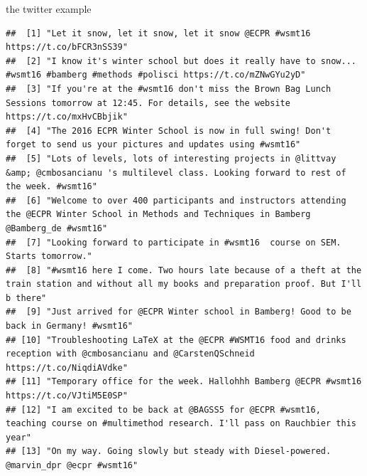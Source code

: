 \documentclass[ignorenonframetext,]{beamer}
\newenvironment{Shaded}{\begin{snugshade}}{\end{snugshade}}
\newcommand{\KeywordTok}[1]{\textcolor[rgb]{0.13,0.29,0.53}{\textbf{{#1}}}}
\newcommand{\DataTypeTok}[1]{\textcolor[rgb]{0.13,0.29,0.53}{{#1}}}
\newcommand{\StringTok}[1]{\textcolor[rgb]{0.31,0.60,0.02}{{#1}}}
\newcommand{\OtherTok}[1]{\textcolor[rgb]{0.56,0.35,0.01}{{#1}}}
\newcommand{\NormalTok}[1]{{#1}}
\begin{document}
\begin{frame}[fragile]{the twitter example}

\begin{Shaded}
\end{Shaded}

\begin{verbatim}
##  [1] "Let it snow, let it snow, let it snow @ECPR #wsmt16 https://t.co/bFCR3nSS39"                                                                   
##  [2] "I know it's winter school but does it really have to snow... #wsmt16 #bamberg #methods #polisci https://t.co/mZNwGYu2yD"                       
##  [3] "If you're at the #wsmt16 don't miss the Brown Bag Lunch Sessions tomorrow at 12:45. For details, see the website https://t.co/mxHvCBbjik"      
##  [4] "The 2016 ECPR Winter School is now in full swing! Don't forget to send us your pictures and updates using #wsmt16"                             
##  [5] "Lots of levels, lots of interesting projects in @littvay &amp; @cmbosancianu 's multilevel class. Looking forward to rest of the week. #wsmt16"
##  [6] "Welcome to over 400 participants and instructors attending the @ECPR Winter School in Methods and Techniques in Bamberg @Bamberg_de #wsmt16"   
##  [7] "Looking forward to participate in #wsmt16  course on SEM. Starts tomorrow."                                                                    
##  [8] "#wsmt16 here I come. Two hours late because of a theft at the train station and without all my books and preparation proof. But I'll b there"  
##  [9] "Just arrived for @ECPR Winter school in Bamberg! Good to be back in Germany! #wsmt16"                                                          
## [10] "Troubleshooting LaTeX at the @ECPR #WSMT16 food and drinks reception with @cmbosancianu and @CarstenQSchneid https://t.co/NiqdiAVdke"          
## [11] "Temporary office for the week. Hallohhh Bamberg @ECPR #wsmt16 https://t.co/VJtiM5E0SP"                                                         
## [12] "I am excited to be back at @BAGSS5 for @ECPR #wsmt16, teaching course on #multimethod research. I'll pass on Rauchbier this year"              
## [13] "On my way. Going slowly but steady with Diesel-powered. @marvin_dpr @ecpr #wsmt16"                                                             

\end{verbatim}
\end{frame}
\end{document}
